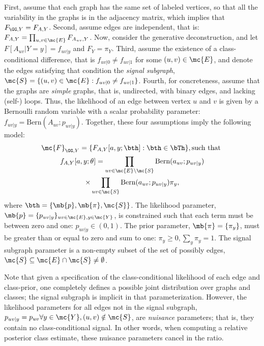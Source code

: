 \documentclass[10pt,journal,cspaper,compsoc]{IEEEtran}
\begin{document}
First,  assume that each graph has the same set of labeled vertices, so that all the variability in the graphs is in the adjacency matrix, which implies that $F_{\GG,Y}=F_{A,Y}$. Second, assume edges are independent, that is: $F_{A,Y}=\prod_{u,v \in \mc{E}} F_{A_{uv},Y}$.  Now, consider the generative deconstruction, and let $F[A_{uv} | Y=y]=f_{uv|y}$ and $F_Y=\pi_Y$.  Third, assume the existence of a class-conditional difference, that is $f_{uv|0} \neq f_{uv|1}$ for some $(u,v) \in \mc{E}$, and denote the edges satisfying that condition  the \emph{signal subgraph}, $\mc{S}=\{(u,v) \in \mc{E}: f_{uv|0} \neq f_{uv|1}\}$.  Fourth, for concreteness, assume that the graphs are \emph{simple} graphs, that is, undirected, with binary edges, and lacking (self-) loops.  Thus, the likelihood of an edge between vertex $u$ and $v$ is given by a Bernoulli random variable with a scalar probability parameter:  $f_{uv|y}=\text{Bern}(A_{uv}; p_{uv|y})$. Together, these four assumptions imply the following model: 
\begin{multline}
\mc{F}_{\GG,Y}=\{F_{A, Y}[a,y; \bth]:   \bth \in \bTh\}, 
\text{such that } \\ f_{A,Y}[a,y; \theta]  =\prod_{uv \in \mc{E} \backslash \mc{S}} \text{Bern}(a_{uv}; p_{uv|y}) \\ \times \prod_{uv \in \mc{S}} \text{Bern}(a_{uv}; p_{uv|y})  \pi_y,
\end{multline}
where $\bth=\{\mb{p},\mb{\pi},\mc{S}\}$. The likelihood parameter, $\mb{p}=\{p_{uv|y}\}_{uv \in \mc{E}, y \in \mc{Y}}$, is constrained such that each term must be between zero and one: $p_{uv|y} \in (0,1)$.  The prior parameter, $\mb{\pi}=\{\pi_y\}$, must be greater than or equal to zero and sum to one: $\pi_y \geq 0, \sum_y \pi_y=1$.  The signal subgraph parameter is a non-empty subset of the set of possibly edges, $\mc{S} \subseteq \mc{E} \cap \mc{S} \neq \emptyset$.

Note that given a specification of the class-conditional likelihood of each edge and class-prior, one completely defines a possible joint distribution over graphs and classes; the signal subgraph is implicit in that parameterization. However, the likelihood parameters for all edges not in the signal subgraph, $p_{uv|y}=p_{uv} \forall y \in \mc{Y}, (u,v) \notin \mc{S}$,  are \emph{nuisance} parameters; that is, they contain no class-conditional signal.  In other words, when computing a relative posterior class estimate, these nuisance parameters cancel in the ratio.
\end{document}
